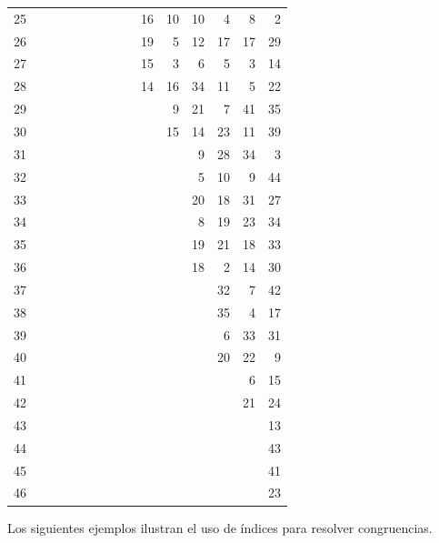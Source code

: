 \documentclass[12pt,a4paper]{book}
\begin{document}
\begin{table}[H]
\begin{tabular}{r|rrrrrrrrrrrrrr}
            25&&&&&&&&&16&10&10&4&8&2\\[3pt]
            26&&&&&&&&&19&5&12&17&17&29\\
            27&&&&&&&&&15&3&6&5&3&14\\
            28&&&&&&&&&14&16&34&11&5&22\\
            29&&&&&&&&&&9&21&7&41&35\\
            30&&&&&&&&&&15&14&23&11&39\\[3pt]
            31&&&&&&&&&&&9&28&34&3\\
            32&&&&&&&&&&&5&10&9&44\\
            33&&&&&&&&&&&20&18&31&27\\
            34&&&&&&&&&&&8&19&23&34\\
            35&&&&&&&&&&&19&21&18&33\\[3pt]
            36&&&&&&&&&&&18&2&14&30\\
            37&&&&&&&&&&&&32&7&42\\
            38&&&&&&&&&&&&35&4&17\\
            39&&&&&&&&&&&&6&33&31\\
            40&&&&&&&&&&&&20&22&9\\[3pt]
            41&&&&&&&&&&&&&6&15\\
            42&&&&&&&&&&&&&21&24\\
            43&&&&&&&&&&&&&&13\\
            44&&&&&&&&&&&&&&43\\
            45&&&&&&&&&&&&&&41\\[3pt]
            46&&&&&&&&&&&&&&23\\
        \end{tabular}
    \end{table}

    Los siguientes ejemplos ilustran el uso de índices para resolver congruencias.
\end{document}
